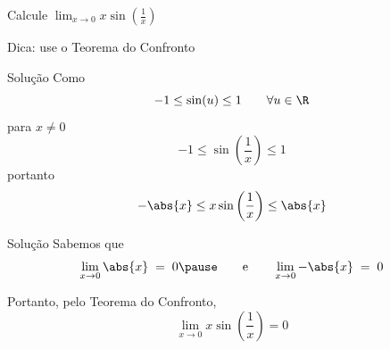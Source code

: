 \begin{question}
  Calcule
  \(
    \lim_{x \to 0} x\sin\left(\frac{1}{x}\right)
  \)

  \bigskip
  \pause
  Dica: use o Teorema do Confronto
\end{question}

\begin{resolution}{Solução}
  Como
  \[
    -1 \leq \sin(u) \leq 1 \qquad \forall u \in \R
  \]
  \pause
  para $x\neq 0$
  \[
    -1 \leq \sin\left(\frac{1}{x}\right) \leq 1
  \]
  \pause
  portanto
  \[
    -\abs{x} \leq x\sin\left(\frac{1}{x}\right) \leq \abs{x}
  \]
\end{resolution}

\begin{resolution}{Solução}
  Sabemos que
  \[
    \lim_{x\to 0} \abs{x} \;=\; 0
    \pause
    \qquad\text{e}\qquad
    \lim_{x\to 0} -\abs{x} \;=\; 0
  \]

  \pause
  Portanto, pelo Teorema do Confronto,
  \pause
  \[
    \lim_{x \to 0} x\sin\left(\frac{1}{x}\right) = 0
  \]
\end{resolution}

